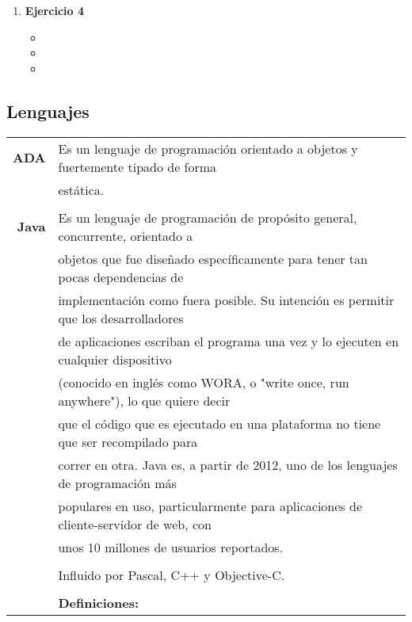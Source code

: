 \documentclass[a4paper,10pt]{article}
\begin{document}
\begin{enumerate}
    \newpage
    
        \item \textbf{Ejercicio 4}
            \begin{itemize}
                \item 
                \item
                \item 
            \end{itemize}    
    \end{enumerate}

\subsection{Lenguajes}
    \begin{tabular}{r|l}
        \textbf{ADA} 
            & Es un lenguaje de programación orientado a objetos y fuertemente tipado de forma \\ 
            & estática.  \\
            & \\
        \textbf{Java}
            & Es un lenguaje de programación de propósito general, concurrente, orientado a \\ 
            & objetos que fue diseñado específicamente para tener tan pocas dependencias de \\ 
            & implementación como fuera posible. Su intención es permitir que los desarrolladores \\ 
            & de aplicaciones escriban el programa una vez y lo ejecuten en cualquier dispositivo \\ 
            & (conocido en inglés como WORA, o "write once, run anywhere"), lo que quiere decir \\
            & que el código que es ejecutado en una plataforma no tiene que ser recompilado para \\ 
            & correr en otra. Java es, a partir de 2012, uno de los lenguajes de programación más \\ 
            & populares en uso, particularmente para aplicaciones de cliente-servidor de web, con \\ 
            & unos 10 millones de usuarios reportados. \\ & \\
            & Influido por Pascal, C++ y Objective-C. \\ & \\
            & \textbf{Definiciones:} \\

\end{tabular}
\end{document}
